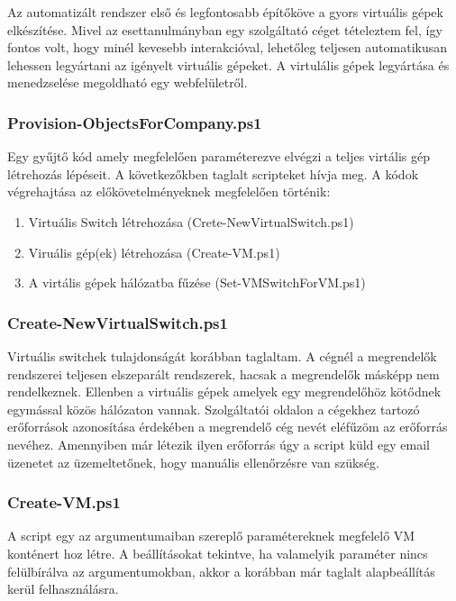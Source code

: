 \documentclass[12pt,oneside,justify,table]{book}
\begin{document}
Az automatizált rendszer első és legfontosabb építőköve a gyors virtuális gépek elkészítése. Mivel az esettanulmányban egy szolgáltató céget tételeztem fel, így fontos volt, hogy minél kevesebb interakcióval, lehetőleg teljesen automatikusan lehessen legyártani az igényelt virtuális gépeket. A virtulális gépek legyártása és menedzselése megoldható egy webfelületről.

\subsubsection{Provision-ObjectsForCompany.ps1}
Egy gyűjtő kód amely megfelelően paraméterezve elvégzi a teljes virtális gép létrehozás lépéseit. 
A következőkben taglalt scripteket hívja meg. 
A kódok végrehajtása az előkövetelményeknek megfelelően történik:
\begin{enumerate}
	\item Virtuális Switch létrehozása (Crete-NewVirtualSwitch.ps1)
	\item Viruális gép(ek) létrehozása (Create-VM.ps1)
	\item A virtális gépek hálózatba fűzése (Set-VMSwitchForVM.ps1)
\end{enumerate}


\subsubsection{Create-NewVirtualSwitch.ps1}

Virtuális switchek tulajdonságát korábban taglaltam. A cégnél a megrendelők rendszerei teljesen elszeparált rendszerek, hacsak a megrendelők másképp nem rendelkeznek. Ellenben a virtuális gépek amelyek egy megrendelőhöz kötődnek egymással közös hálózaton vannak. Szolgáltatói oldalon a cégekhez tartozó erőforrások azonosítása érdekében a megrendelő cég nevét eléfűzöm az erőforrás nevéhez. Amennyiben már létezik ilyen erőforrás úgy a script küld egy email üzenetet az üzemeltetőnek, hogy manuális ellenőrzésre van szükség.

\subsubsection{Create-VM.ps1}

A script egy az argumentumaiban szereplő paramétereknek megfelelő VM konténert hoz létre. A beállításokat tekintve, ha valamelyik paraméter nincs felülbírálva az argumentumokban, akkor a korábban már taglalt alapbeállítás kerül felhasználásra.
\end{document}
